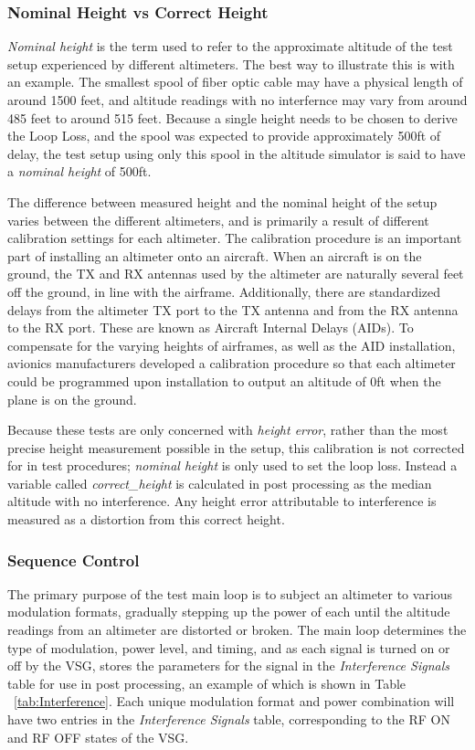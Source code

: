 \subsubsection{Nominal Height vs Correct Height}\label{subsub:nominal}
\textit{Nominal height} is the term used to refer to the approximate altitude of the test setup experienced by different altimeters. The best way to illustrate this is with an example.  The smallest spool of fiber optic cable may have a physical length of around 1500 feet, and altitude readings with no interfernce may vary from around 485 feet to around 515 feet.  Because a single height needs to be chosen to derive the Loop Loss, and the spool was expected to provide approximately 500ft of delay, the test setup using only this spool in the altitude simulator is said to have a \textit{nominal height} of 500ft.  

The difference between measured height and the nominal height of the setup varies between the different altimeters, and is primarily a result of different calibration settings for each altimeter. The calibration procedure is an important part of installing an altimeter onto an aircraft. When an aircraft is on the ground, the TX and RX antennas used by the altimeter are naturally several feet off the ground, in line with the airframe. Additionally, there are standardized delays from the altimeter TX port to the TX antenna and from the RX antenna to the RX port. These are known as Aircraft Internal Delays (AIDs). To compensate for the varying heights of airframes, as well as the AID installation, avionics manufacturers developed a calibration procedure so that each altimeter could be programmed upon installation to output an altitude of 0ft when the plane is on the ground. 

Because these tests are only concerned with \textit{height error}, rather than the most precise height measurement possible in the setup, this calibration is not corrected for in test procedures; \textit{nominal height} is only used to set the loop loss. Instead a variable called \textit{correct\_height} is calculated in post processing as the median altitude with no interference. Any height error attributable to interference is measured as a distortion from this correct height.

\subsubsection{Sequence Control}\label{subsub:sequence}
The primary purpose of the test main loop is to subject an altimeter to various modulation formats, gradually stepping up the power of each until the altitude readings from an altimeter are distorted or broken. The main loop determines the type of modulation, power level, and timing, and as each signal is turned on or off by the VSG, stores the parameters for the signal in the \textit{Interference Signals} table for use in post processing, an example of which is shown in Table ~\ref{tab:Interference}. Each unique modulation format and power combination will have two entries in the \textit{Interference Signals} table, corresponding to the RF ON and RF OFF states of the VSG.  

